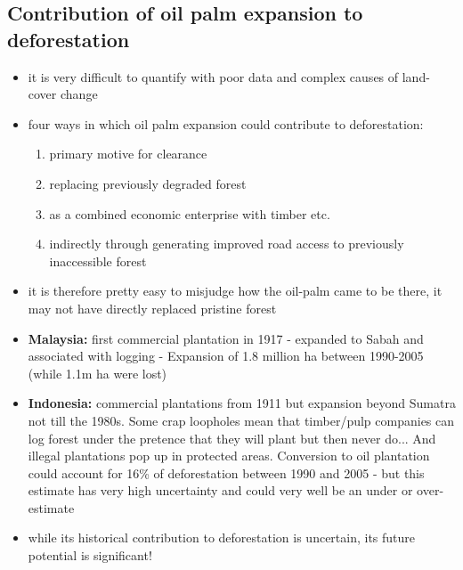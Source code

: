 \subsection*{Contribution of oil palm expansion to deforestation}
\begin{itemize}
	\item it is very difficult to quantify with poor data and complex causes of land-cover change
	\item four ways in which oil palm expansion could contribute to deforestation:
	\begin{enumerate}
		\item primary motive for clearance
		\item replacing previously degraded forest
		\item as a combined economic enterprise with timber etc.
		\item indirectly through generating improved road access to previously inaccessible forest 
	\end{enumerate}
	\item it is therefore pretty easy to misjudge how the oil-palm came to be there, it may not have directly replaced pristine forest
	\item \textbf{Malaysia:} first commercial plantation in 1917 - expanded to Sabah and associated with logging - Expansion of 1.8 million ha between 1990-2005 (while 1.1m ha were lost)
	\item \textbf{Indonesia:} commercial plantations from 1911 but expansion beyond Sumatra not till the 1980s. Some crap loopholes mean that timber/pulp companies can log forest under the pretence that they will plant but then never do... And illegal plantations pop up in protected areas. Conversion to oil plantation could account for 16\% of deforestation between 1990 and 2005 - but this estimate has very high uncertainty and could very well be an under or over-estimate
	\item while its historical contribution to deforestation is uncertain, its future potential is significant!
\end{itemize}


